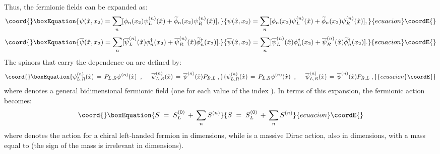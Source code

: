 \documentclass[a4paper,12pt]{article}
\begin{document}
{{Thus, the fermionic fields can be expanded as:
\begin{equation}\coord{}\boxEquation{
\psi (\hat x , x_2 ) = \sum_n [\phi_n(x_2) \psi_L^{(n)}(\hat x) +
\widetilde{\phi}_n(x_2) \psi_R^{(n)}(\hat x)] ,
}{
\psi (\hat x , x_2 ) = \sum_n [\phi_n(x_2) \psi_L^{(n)}(\hat x) +
\widetilde{\phi}_n(x_2) \psi_R^{(n)}(\hat x)] ,
}{ecuacion}\coordE{}\end{equation}
\begin{equation}\coord{}\boxEquation{
\overline{\psi} (\hat x , x_2 ) = \sum_n [\overline{\psi}_L^{(n)}(\hat x) \phi_n^{\dagger}(x_2)
+ \overline{\psi}_R^{(n)}(\hat x) \widetilde{\phi}_n^{\dagger}(x_2)] .
}{
\overline{\psi} (\hat x , x_2 ) = \sum_n [\overline{\psi}_L^{(n)}(\hat x) \phi_n^{\dagger}(x_2)
+ \overline{\psi}_R^{(n)}(\hat x) \widetilde{\phi}_n^{\dagger}(x_2)] .
}{ecuacion}\coordE{}\end{equation}
The spinors that carry the dependence on \coordHE{} are defined by:
\begin{equation}\coord{}\boxEquation{
\psi_{L,R}^{(n)}(\hat x)\,=\,P_{L,R} \psi^{(n)}(\hat x)\;\;,\;\;\;\;\;
\overline{\psi}_{L,R}^{(n)}(\hat x)\,=\,\overline{\psi}^{(n)}(\hat x) P_{R,L}\;,
}{
\psi_{L,R}^{(n)}(\hat x)\,=\,P_{L,R} \psi^{(n)}(\hat x)\;\;,\;\;\;\;\;
\overline{\psi}_{L,R}^{(n)}(\hat x)\,=\,\overline{\psi}^{(n)}(\hat x) P_{R,L}\;,
}{ecuacion}\coordE{}\end{equation}
where \coordHE{} denotes a general bidimensional fermionic
field (one for each value of the index \coordHE{}). In terms of this
expansion, the fermionic action becomes:
\begin{equation}\coord{}\boxEquation{
   \label{eq:actexp}
S \;=\; S_L^{(0)} \,+\, \sum_n  S^{(n)}
}{
   S \;=\; S_L^{(0)} \,+\, \sum_n  S^{(n)}
}{ecuacion}\coordE{}\end{equation}
where \coordHE{} denotes the action for a chiral left-handed fermion
in \coordHE{} dimensions, while \coordHE{} is a massive Dirac action, also
in \coordHE{} dimensions, with a mass equal to \coordHE{} (the sign of the
mass is irrelevant in \coordHE{} dimensions).

}}
\end{document}

